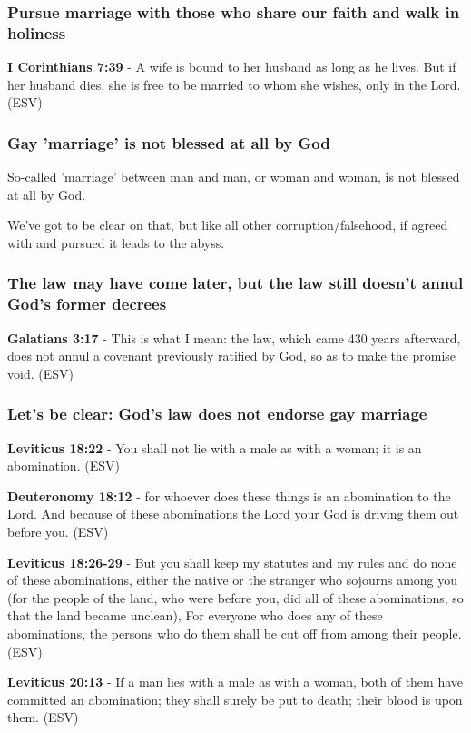 \documentclass[11pt]{article}
\begin{document}
\subsubsection{Pursue marriage with those who share our faith and walk in holiness}
\label{sec:org5be9cdd}
\textbf{I Corinthians 7:39} - A wife is bound to her husband as long as he lives. But if her husband dies, she is free to be married to whom she wishes, only in the Lord. (ESV)

\subsubsection{Gay 'marriage' is not blessed at all by God}
\label{sec:orgae833e4}
So-called 'marriage' between man and man, or woman and woman, is not blessed at all by God.

We've got to be clear on that, but like all other corruption/falsehood, if agreed with and pursued it leads to the abyss.

\subsubsection{The law may have come later, but the law still doesn't annul God's former decrees}
\label{sec:orgca30d5c}
\textbf{Galatians 3:17} - This is what I mean: the law, which came 430 years afterward, does not annul a covenant previously ratified by God, so as to make the promise void. (ESV)

\subsubsection{Let's be clear: God's law does not endorse gay marriage}
\label{sec:org9a4f684}
\textbf{Leviticus 18:22} - You shall not lie with a male as with a woman; it is an abomination. (ESV)

\textbf{Deuteronomy 18:12} - for whoever does these things is an abomination to the Lord. And because of these abominations the Lord your God is driving them out before you. (ESV)

\textbf{Leviticus 18:26-29} - But you shall keep my statutes and my rules and do none of these abominations, either the native or the stranger who sojourns among you (for the people of the land, who were before you, did all of these abominations, so that the land became unclean), For everyone who does any of these abominations, the persons who do them shall be cut off from among their people. (ESV)

\textbf{Leviticus 20:13} - If a man lies with a male as with a woman, both of them have committed an abomination; they shall surely be put to death; their blood is upon them. (ESV)
\end{document}
